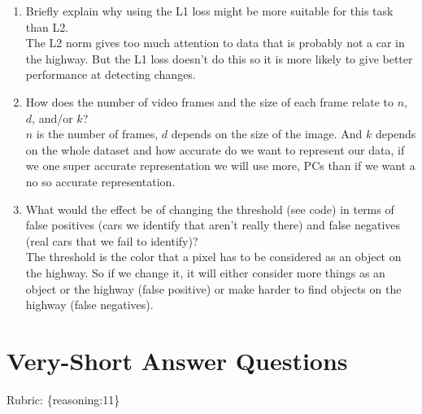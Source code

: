 \documentclass{article}
\def\rubric#1{\gre{Rubric: \{#1\}}}{}
\def\gre#1{{\color{gre}#1}}
\def\ans#1{{\color{ans}#1}}
\def\enum#1{\begin{enumerate}#1\end{enumerate}}
\begin{document}
\enum{
\item Briefly explain why using the L1 loss might be more suitable for this task than L2. \\
\ans{
    The L2 norm gives too much attention to data that is probably not a car in the highway. But the 
    L1 loss doesn't do this so it is more likely to give better performance at detecting changes.
}
\item How does the number of video frames and the size of each frame relate to $n$, $d$, and/or $k$? \\
\ans{
    $n$ is the number of frames, $d$ depends on the size of the image. And $k$ 
    depends on the whole dataset and how accurate do we want to represent our 
    data, if we one super accurate representation we will use more, PCs than if we want a no so 
    accurate representation.
}
\item What would the effect be of changing the threshold (see code) in terms of false positives (cars we identify that aren't really there) and false negatives (real cars that we fail to identify)? \\
\ans{
    The threshold is the color that a pixel has to be considered as an object on the highway. So if 
    we change it, it will either consider more things as an object or the highway (false positive) 
    or make harder to find objects on the highway (false negatives).
}
}

\section{Very-Short Answer Questions}
\rubric{reasoning:11}
\end{document}
